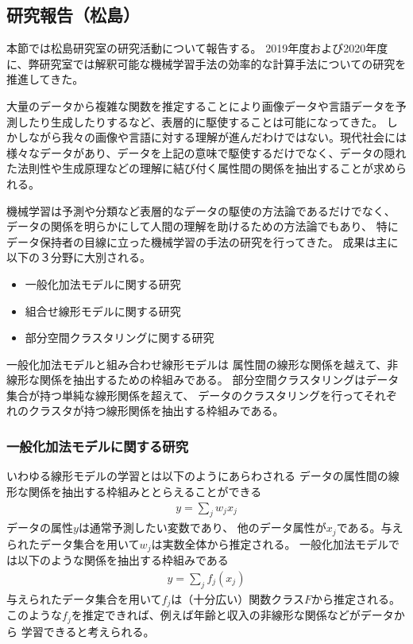 \subsection{研究報告（松島）}
本節では松島研究室の研究活動について報告する。
2019年度および2020年度に、弊研究室では解釈可能な機械学習手法の効率的な計算手法についての研究を推進してきた。

大量のデータから複雑な関数を推定することにより画像データや言語データを予測したり生成したりするなど、表層的に駆使することは可能になってきた。
しかしながら我々の画像や言語に対する理解が進んだわけではない。現代社会には様々なデータがあり、データを上記の意味で駆使するだけでなく、データの隠れた法則性や生成原理などの理解に結び付く属性間の関係を抽出することが求められる。

機械学習は予測や分類など表層的なデータの駆使の方法論であるだけでなく、
データの関係を明らかにして人間の理解を助けるための方法論でもあり、
特にデータ保持者の目線に立った機械学習の手法の研究を行ってきた。
成果は主に以下の３分野に大別される。
\begin{itemize}
    \item 一般化加法モデルに関する研究
    \item 組合せ線形モデルに関する研究
    \item 部分空間クラスタリングに関する研究
\end{itemize}

一般化加法モデルと組み合わせ線形モデルは
属性間の線形な関係を越えて、非線形な関係を抽出するための枠組みである。
部分空間クラスタリングはデータ集合が持つ単純な線形関係を超えて、
データのクラスタリングを行ってそれぞれのクラスタが持つ線形関係を抽出する枠組みである。


\subsubsection{一般化加法モデルに関する研究}
いわゆる線形モデルの学習とは以下のようにあらわされる
データの属性間の線形な関係を抽出する枠組みととらえることができる
\begin{align*}
    y = \sum_{j} w_j x_j
\end{align*}
データの属性$y$は通常予測したい変数であり、
他のデータ属性が$x_j$である。与えられたデータ集合を用いて$w_j$は実数全体から推定される。
一般化加法モデルでは以下のような関係を抽出する枠組みである
\begin{align*}
    y = \sum_{j} f_j (x_j)
\end{align*}
与えられたデータ集合を用いて$f_j$は（十分広い）関数クラス$F$から推定される。
このような$f_j$を推定できれば、例えば年齢と収入の非線形な関係などがデータから
学習できると考えられる。

